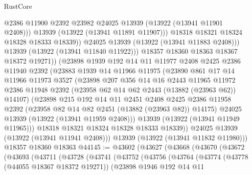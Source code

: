 \begin{lexlean}{RustCore}
\begin{coremodule}
                      @2386
                      @11900
                      @2392
                      @23982
                      @24025
                      @13939
                      (@13922 (@13941 @11901 @2408)))
                    @13939
                    (@13922 (@13941 @11891 @11907)))
                  @18318
                  @18321
                  @18324
                  @18328
                  @18333
                  @18339))
              @24025
              @13939
              (@13922 (@13941 @11883 @2408)))
            @13939
            (@13922 (@13941 @11840 @11922)))
          @18357
          @18360
          @18363
          @18367
          @18372
          @19271))
      (@23898
        @1939
        @192
        @14
        @11
        @11977
        @2408
        @2425
        @2386
        @11940
        @2392
        (@23883
          @1939
          @14
          @11966
          @11975
          (@23890
            @861
            @17
            @14
            @11966
            @11973
            @3527
            (@23898
              @207
              @356
              @14
              @16
              @2443
              @11965
              @11972
              @2386
              @11948
              @2392
              (@23958 @62 @14 @62 @2443 (@13882 (@23963 @62)) @14107)
              (@23898
                @215
                @192
                @14
                @11
                @2451
                @2408
                @2425
                @2386
                @11958
                @2392
                (@23958 @82 @14 @82 @2451 (@13882 (@23963 @82)) @14175)
                @24025
                @13939
                (@13922 (@13941 @11959 @2408)))
              @13939
              (@13922 (@13941 @11949 @11965)))
            @18318
            @18321
            @18324
            @18328
            @18333
            @18339))
        @24025
        @13939
        (@13922 (@13941 @11941 @2408)))
      @13939
      (@13922 (@13941 @11832 @11980)))
    @18357
    @18360
    @18363
@44145 := @43602
    (@43627
      (@43668
        (@43670
          (@43672
            (@43693
              (@43711
                (@43728
                  (@43741
                    (@43752
                      (@43756
                        (@43764
                          (@43774
                            (@43778 (@44055 @18367 @18372 @19271))
                            (@23898
                              @1946
                              @192
                              @14
                              @11

\end{coremodule}
\end{lexlean}
